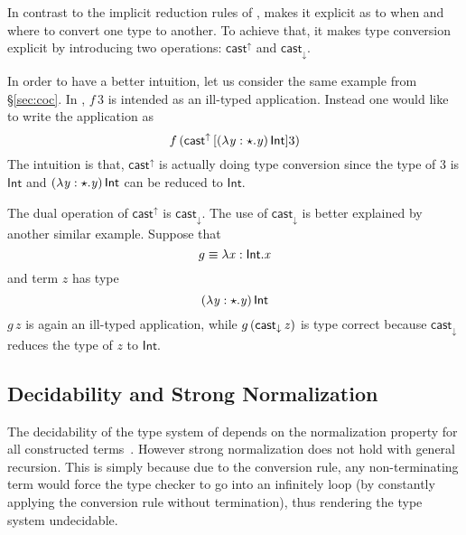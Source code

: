 
In contrast to the implicit reduction rules of \coc, \name makes it explicit as to when and where to convert one type to another. To achieve that, it makes type conversion explicit by introducing two operations: $ \mathsf{cast}^{\uparrow} $ and $ \mathsf{cast}_{\downarrow} $.

In order to have a better intuition, let us consider the same example from \S\ref{sec:coc}. In \name, $f\,3$ is intended as an ill-typed application. Instead one would like to write the application as \[ f\,(\mathsf{cast}^{\uparrow} \, [  (  \lambda  \mathit{y}  :  \star  .  \mathit{y}  ) \, \mathsf{Int}  ]  3) \] The intuition is that, $ \mathsf{cast}^{\uparrow} $ is actually doing type conversion since the type of $ 3 $ is $  \mathsf{Int}  $ and $ (  \lambda  \mathit{y}  :  \star  .  \mathit{y}  ) \, \mathsf{Int} $ can be reduced to $  \mathsf{Int}  $.

The dual operation of $ \mathsf{cast}^{\uparrow} $ is $ \mathsf{cast}_{\downarrow} $. The use of $ \mathsf{cast}_{\downarrow} $ is better explained by another similar example. Suppose that \[ g \equiv \lambda  \mathit{x}  :  \mathsf{Int}  .  \mathit{x} \] and term $z$ has type \[ (  \lambda  \mathit{y}  :  \star  .  \mathit{y}  ) \, \mathsf{Int} \] $ g\,z $ is again an ill-typed application, while $ g\,(\mathsf{cast}_{\downarrow} \, \mathit{z}) $ is type correct because $ \mathsf{cast}_{\downarrow} $ reduces the type of $ z $ to $  \mathsf{Int}  $.

\subsection{Decidability and Strong Normalization}


The decidability of the type system of \coc depends on the normalization property for all constructed terms~\cite{coc:decidability}. However strong normalization does not hold with general recursion. This is simply because due to the conversion rule, any non-terminating term would force the type checker to go into an infinitely loop (by constantly applying the conversion rule without termination), thus rendering the type system undecidable.

